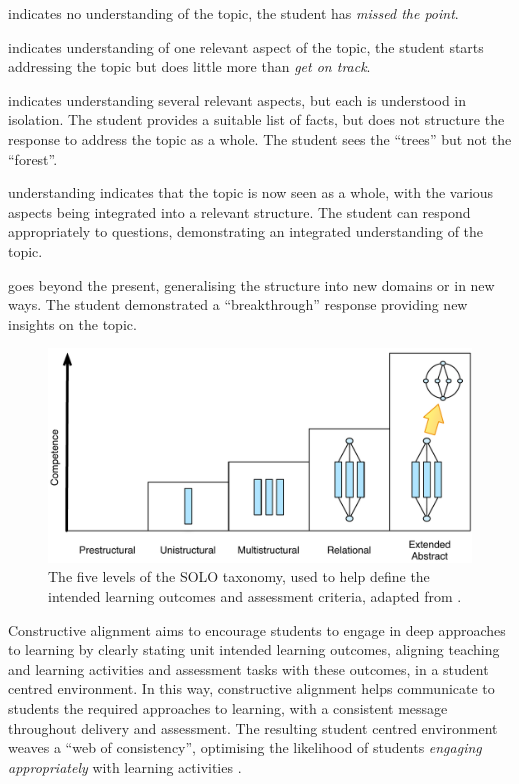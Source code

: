 \begin{description}
 	\item[Prestructural] indicates no understanding of the topic, the student has \emph{missed the point}.
 	\item[Unistructural] indicates understanding of one relevant aspect of the topic, the student starts addressing the topic but does little more than \emph{get on track}.
 	\item[Multistructural] indicates understanding several relevant aspects, but each is understood in isolation. The student provides a suitable list of facts, but does not structure the response to address the topic as a whole. The student sees the ``trees'' but not the ``forest''.
 	\item[Relational] understanding indicates that the topic is now seen as a whole, with the various aspects being integrated into a relevant structure. The student can respond appropriately to questions, demonstrating an integrated understanding of the topic.
 	\item[Extended Abstract] goes beyond the present, generalising the structure into new domains or in new ways. The student demonstrated a ``breakthrough'' response providing new insights on the topic.
\end{description} 

\begin{figure}[htbp]
	\centering
	\includegraphics[width=\textwidth]{SOLO}
	\caption{The five levels of the SOLO taxonomy, used to help define the intended learning outcomes and assessment criteria, adapted from \citet{Biggs:2007}.}
	\label{fig:solo}
\end{figure}

Constructive alignment aims to encourage students to engage in deep approaches to learning by clearly stating unit intended learning outcomes, aligning teaching and learning activities and assessment tasks with these outcomes, in a student centred environment. In this way, constructive alignment helps communicate to students the required approaches to learning, with a consistent message throughout delivery and assessment. The resulting student centred environment weaves a ``web of consistency'', optimising the likelihood of students \emph{engaging appropriately} with learning activities \cite{Biggs:1999}.

